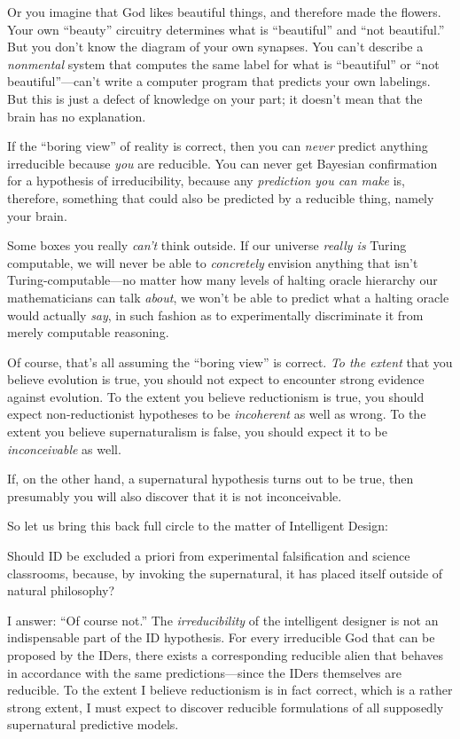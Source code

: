 {
 Or you imagine that God likes beautiful things, and therefore made
the flowers. Your own ``beauty''
circuitry determines what is
``beautiful'' and
``not beautiful.'' But you
don't know the diagram of your own synapses. You
can't describe a \textit{nonmental} system that
computes the same label for what is
``beautiful'' or
``not
beautiful''---can't write a computer
program that predicts your own labelings. But this is just a defect of
knowledge on your part; it doesn't mean that the brain
has no explanation.}

{
 If the ``boring view'' of
reality is correct, then you can \textit{never} predict anything
irreducible because \textit{you} are reducible. You can never get
Bayesian confirmation for a hypothesis of irreducibility, because any
\textit{prediction you can make} is, therefore, something that could
also be predicted by a reducible thing, namely your brain.}

{
 Some boxes you really \textit{can't} think
outside. If our universe \textit{really is} Turing computable, we will
never be able to \textit{concretely} envision anything that
isn't Turing-computable---no matter how many levels of
halting oracle hierarchy our mathematicians can talk \textit{about}, we
won't be able to predict what a halting oracle would
actually \textit{say}, in such fashion as to experimentally
discriminate it from merely computable reasoning.}

{
 Of course, that's all assuming the
``boring view'' is correct.
\textit{To the extent} that you believe evolution is true, you should
not expect to encounter strong evidence against evolution. To the
extent you believe reductionism is true, you should expect
non-reductionist hypotheses to be \textit{incoherent} as well as wrong.
To the extent you believe supernaturalism is false, you should expect
it to be \textit{inconceivable} as well.}

{
 If, on the other hand, a supernatural hypothesis turns out to be
true, then presumably you will also discover that it is not
inconceivable.}

{
 So let us bring this back full circle to the matter of Intelligent
Design:}

{
 Should ID be excluded a priori from experimental falsification and
science classrooms, because, by invoking the supernatural, it has
placed itself outside of natural philosophy?}

{
 I answer: ``Of course not.''
The \textit{irreducibility} of the intelligent designer is not an
indispensable part of the ID hypothesis. For every irreducible God that
can be proposed by the IDers, there exists a corresponding reducible
alien that behaves in accordance with the same predictions---since the
IDers themselves are reducible. To the extent I believe reductionism is
in fact correct, which is a rather strong extent, I must expect to
discover reducible formulations of all supposedly supernatural
predictive models.}

